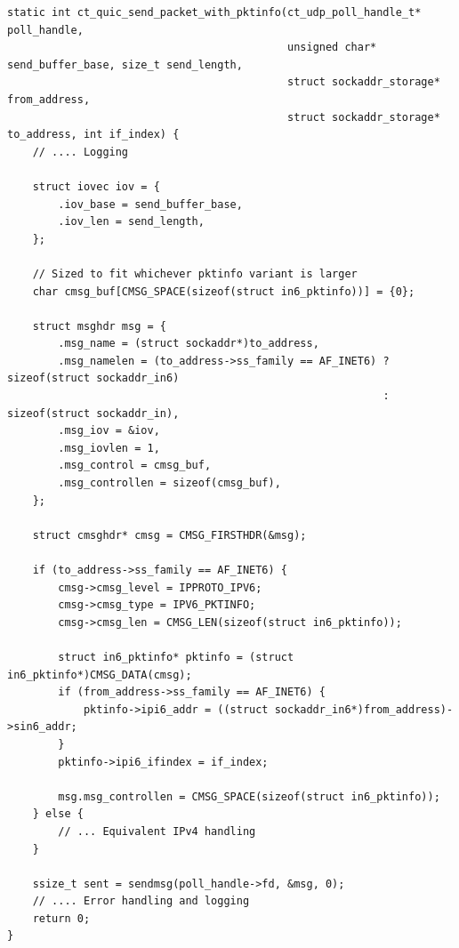 \begin{listing}[htbp]
    \begin{verbatim}
static int ct_quic_send_packet_with_pktinfo(ct_udp_poll_handle_t* poll_handle,
                                            unsigned char* send_buffer_base, size_t send_length,
                                            struct sockaddr_storage* from_address,
                                            struct sockaddr_storage* to_address, int if_index) {
    // .... Logging

    struct iovec iov = {
        .iov_base = send_buffer_base,
        .iov_len = send_length,
    };

    // Sized to fit whichever pktinfo variant is larger
    char cmsg_buf[CMSG_SPACE(sizeof(struct in6_pktinfo))] = {0};

    struct msghdr msg = {
        .msg_name = (struct sockaddr*)to_address,
        .msg_namelen = (to_address->ss_family == AF_INET6) ? sizeof(struct sockaddr_in6)
                                                           : sizeof(struct sockaddr_in),
        .msg_iov = &iov,
        .msg_iovlen = 1,
        .msg_control = cmsg_buf,
        .msg_controllen = sizeof(cmsg_buf),
    };

    struct cmsghdr* cmsg = CMSG_FIRSTHDR(&msg);

    if (to_address->ss_family == AF_INET6) {
        cmsg->cmsg_level = IPPROTO_IPV6;
        cmsg->cmsg_type = IPV6_PKTINFO;
        cmsg->cmsg_len = CMSG_LEN(sizeof(struct in6_pktinfo));

        struct in6_pktinfo* pktinfo = (struct in6_pktinfo*)CMSG_DATA(cmsg);
        if (from_address->ss_family == AF_INET6) {
            pktinfo->ipi6_addr = ((struct sockaddr_in6*)from_address)->sin6_addr;
        }
        pktinfo->ipi6_ifindex = if_index;

        msg.msg_controllen = CMSG_SPACE(sizeof(struct in6_pktinfo));
    } else {
        // ... Equivalent IPv4 handling
    }

    ssize_t sent = sendmsg(poll_handle->fd, &msg, 0);
    // .... Error handling and logging
    return 0;
}
    \end{verbatim}
    \caption[Sending a Message over UDP for QUIC]
    {
Function used to send QUIC packets over UDP for Picoquic, manually
building the message header
to control
the from address to match what is specified by Picoquic.
    }
    \label{lst:pktinfo-send-packet}
\end{listing}
